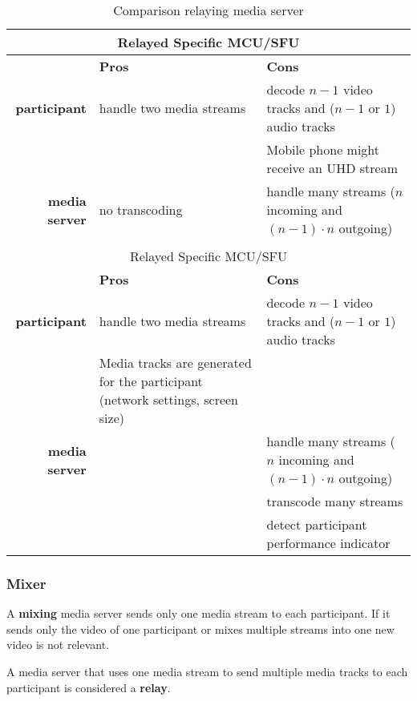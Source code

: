 \documentclass[../../../thesis.tex]{subfiles}
\begin{document}
\begin{table}[h]
\caption{Comparison relaying media server}
\centering
\begin{tabular}{ r p{6cm} p{6cm} }
	\hline
	\multicolumn{3}{|c|}{Relayed Specific MCU/SFU} \\
	\hline
	& \textbf{Pros} & \textbf{Cons} \\
	\cline{2-3}
	\textbf{participant} & handle two media streams & decode \(n-1\) video tracks and (\(n-1\) or \(1\)) audio tracks \\ 
	& & Mobile phone might receive an UHD stream\\
	\cline{2-3}
	\textbf{media server} & no transcoding\footnotemark & handle many streams (\(n\) incoming and \((n-1) \cdot n\) outgoing)\\
	& & \\[1.4em]
	\hline
	\multicolumn{3}{|c|}{Relayed Specific MCU/SFU} \\
	\hline
	& \textbf{Pros} & \textbf{Cons} \\
	\cline{2-3}
	\textbf{participant} & handle two media streams & decode \(n-1\) video tracks and (\(n-1\) or \(1\)) audio tracks \\ 
	& Media tracks are generated for the participant (network settings, screen size) & \\
	\cline{2-3}
	\textbf{media server} & & handle many streams ( \(n\) incoming and \((n-1) \cdot n\) outgoing)\\
	& & transcode many streams\footnotemark \\
	& & detect participant performance indicator\footnotemark\\
\end{tabular}
\end{table}



\clearpage
\subsubsection{Mixer}
A \textbf{mixing} media server sends only one media stream to each participant. If it sends only the video of one participant or mixes multiple streams into one new video is not relevant.\par
A media server that uses one media stream to send multiple media tracks to each participant is considered a \textbf{relay}.\\
\\
\end{document}
